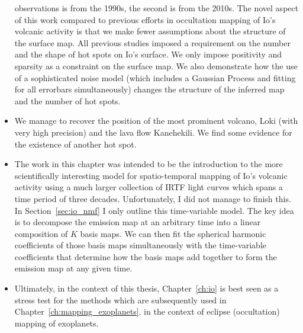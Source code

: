 \documentclass[12pt,dvipsnames]{report}
\begin{document}
\begin{itemize}
observations is from the 1990s, the second is from the 2010s. 
The novel aspect of this work compared to previous efforts in occultation mapping 
of Io's volcanic activity is that we make fewer assumptions about the structure of the
surface map. All previous studies imposed a requirement on the number and the shape of 
hot spots on Io's surface. We only impose positivity and sparsity as a constraint on 
the surface map.
We also demonstrate how the use of a sophisticated noise model (which includes a
Gaussian Process and fitting for all errorbars simultaneously) changes the structure 
of the inferred map and the number of hot spots. 
\item We manage to recover the position of the most prominent volcano, Loki (with very high 
precision) and the lava flow Kanehekili. We find some evidence for the existence of another
hot spot.
\item The work in this chapter was intended to be the introduction to the more scientifically 
interesting model for spatio-temporal mapping of Io's volcanic activity using a much larger 
collection of IRTF light curves which spans a time period of three decades.
Unfortunately, I did not manage to finish this. In Section~\ref{sec:io_nmf} I only outline
this time-variable model. The key idea is to decompose the emission map at an arbitrary time
into a linear composition of $K$ basis maps. We can then fit the spherical harmonic 
coefficients of those basis maps simultaneously with the time-variable coefficients 
that determine how the basis maps add together to form the emission map at any given time.
\item Ultimately, in the context of this thesis, Chapter~\ref{ch:io} is best seen as a 
stress test for the methods which are subsequently used in 
Chapter~\ref{ch:mapping_exoplanets}.
in the context of eclipse (occultation) mapping of exoplanets.
\end{itemize}
\end{document}
